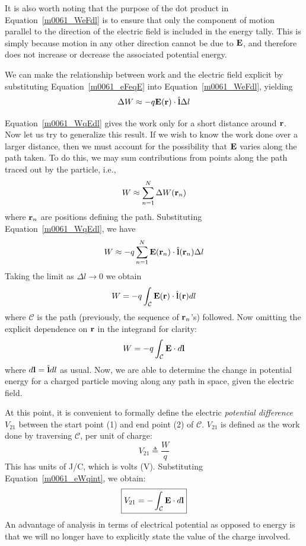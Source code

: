 It is also worth noting that the purpose of the dot product in Equation~\ref{m0061_WeFdl} is to ensure that only the component of motion parallel to the direction of the electric field is included in the energy tally.  This is simply because motion in any other direction cannot be due to ${\bf E}$, and therefore does not increase or decrease the associated potential energy.

We can make the relationship between work and the electric field explicit by substituting Equation~\ref{m0061_eFeqE} into Equation~\ref{m0061_WeFdl}, yielding
%
\begin{equation}
\Delta W \approx -q {\bf E}({\bf r})\cdot\hat{\bf l}\Delta l
\label{m0061_WqEdl}
\end{equation}

Equation~\ref{m0061_WqEdl} gives the work only for a short distance around ${\bf r}$.  
Now let us try to generalize this result.
If we wish to know the work done over a larger distance, then we must account for the possibility that ${\bf E}$ varies along the path taken.
To do this, we may sum contributions from points along the path traced out by the particle, i.e.,
%
\begin{equation}
W \approx \sum_{n=1}^N \Delta W ({\bf r}_n) 
\end{equation}
%
where ${\bf r}_n$ are positions defining the path.  Substituting Equation~\ref{m0061_WqEdl}, we have 
%
\begin{equation}
W \approx -q \sum_{n=1}^N {\bf E}({\bf r}_n)\cdot\hat{\bf l}({\bf r}_n)\Delta l
\end{equation}
%
Taking the limit as $\Delta l\to 0$ we obtain
%
\begin{equation}
W = -q \int_{\mathcal C} {\bf E}({\bf r})\cdot\hat{\bf l}({\bf r}) dl
\end{equation}
%
where $\mathcal{C}$ is the path (previously, the sequence of ${\bf r}_n$'s) followed.
Now omitting the explicit dependence on ${\bf r}$ in the integrand for clarity:
%
\begin{equation}
W = -q \int_{\mathcal C} {\bf E}\cdot d{\bf l}
\label{m0061_eWqint}
\end{equation}
%
where $d{\bf l} = \hat{\bf l}dl$ as usual.
Now, we are able to determine the change in potential energy for a charged particle moving along any path in space, given the electric field.

At this point, it is convenient to formally define the electric {\it potential difference} $V_{21}$ 
between the start point (1) and end point (2) of ${\mathcal C}$.  $V_{21}$ is defined as the work done by traversing ${\mathcal C}$, per unit of charge:
%
\begin{equation}
V_{21} \triangleq \frac{W}{q} 
\end{equation}
%
This has units of J/C, which is volts (V). Substituting Equation~\ref{m0061_eWqint}, we obtain:
%
\begin{equation}
\boxed{
V_{21} = - \int_{\mathcal C} {\bf E} \cdot d{\bf l}
}
\label{m0062_eVAB}
\end{equation}
%
An advantage of analysis in terms of electrical potential as opposed to energy is that we will no longer have to explicitly state the value of the charge involved.  

